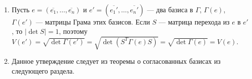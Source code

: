\begin{solution}~
	\begin{enumerate}
		\item Пусть $e = (\overline{e_1}, \ldots, \overline{e_n})$ и $e' = (\overline{e_1'}, \ldots, \overline{e_n'})$ --- два базиса в $\Gamma$, $\Gamma(e)$, $\Gamma(e')$ --- матрицы Грама этих базисов. Если $S$ --- матрица перехода из $e$ в $e'$, то $|\det{S}| = 1$, поэтому $V(e') = \sqrt{\det\Gamma(e')} = \sqrt{\det{(S^T\Gamma(e)S)}} = \sqrt{\det\Gamma(e)} = V(e)$.
		
		\item Данное утверждение следует из теоремы о согласованных базисах из следующего раздела.
	\end{enumerate}
\end{solution}
